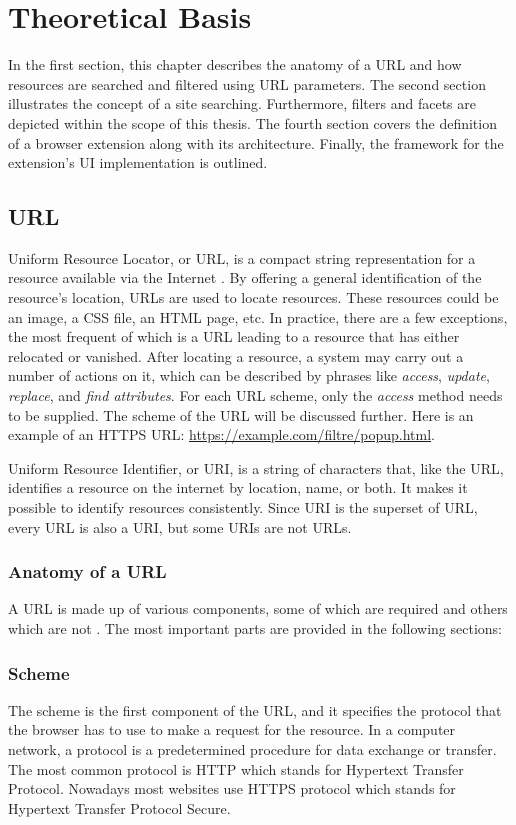 \newpage
\chapter{Theoretical Basis}
In the first section, this chapter describes the anatomy of a URL and how resources are searched and filtered using URL parameters. The second section illustrates the concept of a site searching. Furthermore, filters and facets are depicted within the scope of this thesis. The fourth section covers the definition of a browser extension along with its architecture. Finally, the framework for the extension's UI implementation is outlined.


\section{URL}
Uniform Resource Locator, or URL, is a compact string representation for a resource available via the Internet \autocite{berners1994uniform}. By offering a general identification of the resource's location, URLs are used to locate resources. These resources could be an image, a CSS file, an HTML page, etc. In practice, there are a few exceptions, the most frequent of which is a URL leading to a resource that has either relocated or vanished. After locating a resource, a system may carry out a number of actions on it, which can be described by phrases like \emph{access}, \emph{update}, \emph{replace}, and \emph{find attributes}. For each URL scheme, only the \emph{access} method needs to be supplied. The scheme of the URL will be discussed further. Here is an example of an HTTPS URL: \url{https://example.com/filtre/popup.html}.

Uniform Resource Identifier, or URI, is a string of characters that, like the URL, identifies a resource on the internet by location, name, or both. It makes it possible to identify resources consistently. Since URI is the superset of URL, every URL is also a URI, but some URIs are not URLs.

\subsection{Anatomy of a URL}
\label{url_anatomy}
A URL is made up of various components, some of which are required and others which are not \autocite{mozilla2022url}. The most important parts are provided in the following sections:

\subsection*{Scheme}
The scheme is the first component of the URL, and it specifies the protocol that the browser has to use to make a request for the resource. In a computer network, a protocol is a predetermined procedure for data exchange or transfer. The most common protocol is HTTP which stands for Hypertext Transfer Protocol. Nowadays most websites use HTTPS protocol which stands for Hypertext Transfer Protocol Secure.

